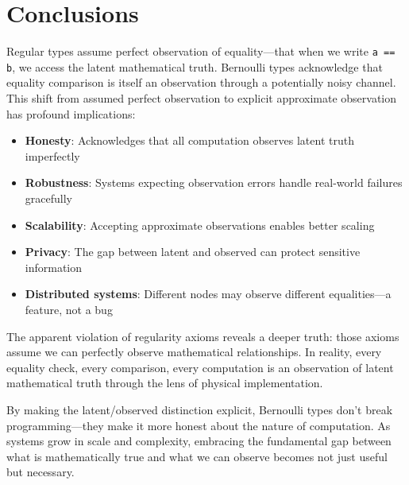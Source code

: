 \documentclass[11pt,final,hidelinks]{article}
\newcommand{\code}[1]{\texttt{#1}}
\begin{document}
\section{Conclusions}

Regular types assume perfect observation of equality—that when we write \code{a == b}, we access the latent mathematical truth. Bernoulli types acknowledge that equality comparison is itself an observation through a potentially noisy channel. This shift from assumed perfect observation to explicit approximate observation has profound implications:

\begin{itemize}
    \item \textbf{Honesty}: Acknowledges that all computation observes latent truth imperfectly
    \item \textbf{Robustness}: Systems expecting observation errors handle real-world failures gracefully
    \item \textbf{Scalability}: Accepting approximate observations enables better scaling
    \item \textbf{Privacy}: The gap between latent and observed can protect sensitive information
    \item \textbf{Distributed systems}: Different nodes may observe different equalities—a feature, not a bug
\end{itemize}

The apparent violation of regularity axioms reveals a deeper truth: those axioms assume we can perfectly observe mathematical relationships. In reality, every equality check, every comparison, every computation is an observation of latent mathematical truth through the lens of physical implementation.

By making the latent/observed distinction explicit, Bernoulli types don't break programming—they make it more honest about the nature of computation. As systems grow in scale and complexity, embracing the fundamental gap between what is mathematically true and what we can observe becomes not just useful but necessary.




\end{document}

